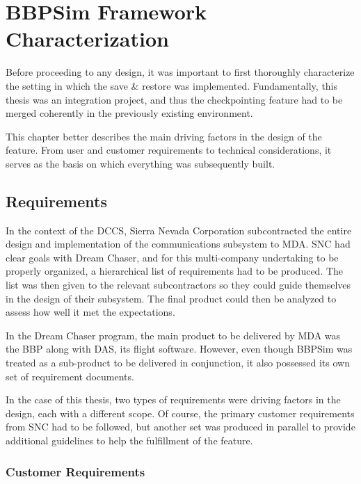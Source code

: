 {
\setlength{\parindent}{2em}
\chapter{BBPSim Framework Characterization}\label{cha:sim-env}
Before proceeding to any design, it was important to first thoroughly characterize the setting in which the save \& restore was implemented. Fundamentally, this thesis was an integration project, and thus the checkpointing feature had to be merged coherently in the previously existing environment.

This chapter better describes the main driving factors in the design of the feature. From user and customer requirements to technical considerations, it serves as the basis on which everything was subsequently built.

\section{Requirements}\label{sec:reqs}
In the context of the \gls{DCCS}, Sierra Nevada Corporation subcontracted the entire design and implementation of the communications subsystem to \gls{MDA}. \gls{SNC} had clear goals with Dream Chaser, and for this multi-company undertaking to be properly organized, a hierarchical list of requirements had to be produced. The list was then given to the relevant subcontractors so they could guide themselves in the design of their subsystem. The final product could then be analyzed to assess how well it met the expectations. 

In the Dream Chaser program, the main product to be delivered by \gls{MDA} was the \gls{BBP} along with \gls{DAS}, its flight software. However, even though \gls{BBPSim} was treated as a sub-product to be delivered in conjunction, it also possessed its own set of requirement documents.

In the case of this thesis, two types of requirements were driving factors in the design, each with a different scope. Of course, the primary customer requirements from \gls{SNC} had to be followed, but another set was produced in parallel to provide additional guidelines to help the fulfillment of the feature.  

\subsection*{Customer Requirements}

}
